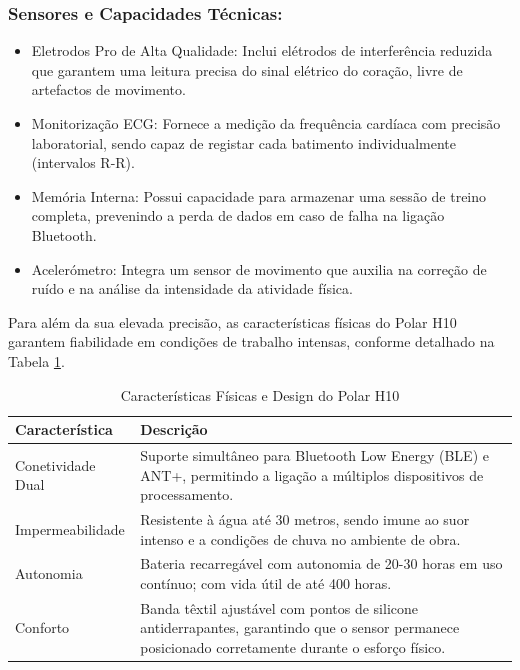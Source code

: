 \subsubsection*{Sensores e Capacidades Técnicas:}

\begin{itemize}
\item Eletrodos Pro de Alta Qualidade: Inclui elétrodos de interferência reduzida que garantem uma leitura precisa do sinal elétrico do coração, livre de artefactos de movimento.
\item Monitorização ECG: Fornece a medição da frequência cardíaca com precisão laboratorial, sendo capaz de registar cada batimento individualmente (intervalos R-R).
\item Memória Interna: Possui capacidade para armazenar uma sessão de treino completa, prevenindo a perda de dados em caso de falha na ligação Bluetooth.
\item Acelerómetro: Integra um sensor de movimento que auxilia na correção de ruído e na análise da intensidade da atividade física.
\end{itemize}

Para além da sua elevada precisão, as características físicas do Polar H10 garantem fiabilidade em condições de trabalho intensas, conforme detalhado na Tabela \ref{tab:polar_features}.

\begin{table}[H]
\centering
\caption{Características Físicas e Design do Polar H10}
\label{tab:polar_features}
\begin{tabular}{l p{10cm}}
\hline
Característica & Descrição \\
\hline
Conetividade Dual & Suporte simultâneo para Bluetooth Low Energy (BLE) e ANT+, permitindo a ligação a múltiplos dispositivos de processamento. \\
\hline
Impermeabilidade & Resistente à água até 30 metros, sendo imune ao suor intenso e a condições de chuva no ambiente de obra. \\
\hline
Autonomia & Bateria recarregável com autonomia de 20-30 horas em uso contínuo; com vida útil de até 400 horas. \\
\hline
Conforto & Banda têxtil ajustável com pontos de silicone antiderrapantes, garantindo que o sensor permanece posicionado corretamente durante o esforço físico. \\
\hline
\end{tabular}
\end{table}

